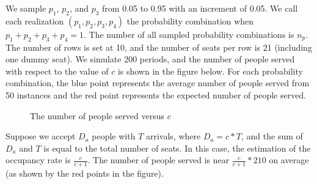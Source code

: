 We sample $p_1$, $p_2$, and $p_3$ from 0.05 to 0.95 with an increment of 0.05. We call each realization $(p_1, p_2, p_3, p_4)$ the probability combination when $p_1 + p_2 + p_3 + p_4 = 1$.
The number of all sampled probability combinations is $n_p$. The number of rows is set at 10, and the number of seats per row is 21 (including one dummy seat). We simulate 200 periods, and the number of people served with respect to the value of $c$ is shown in the figure below. For each probability combination, the blue point represents the average number of people served from 50 instances and the red point represents the expected number of people served.


\begin{figure}[h]
  \centering
  \caption{The number of people served versus $c$}
\end{figure}

Suppose we accept $D_a$ people with $T$ arrivals, where $D_a = c * T$, and the sum of $D_a$ and $T$ is equal to the total number of seats. In this case, the estimation of the occupancy rate is $\frac{c}{c+1}$. The number of people served is near $\frac{c}{c+1} * 210$ on average (as shown by the red points in the figure).

